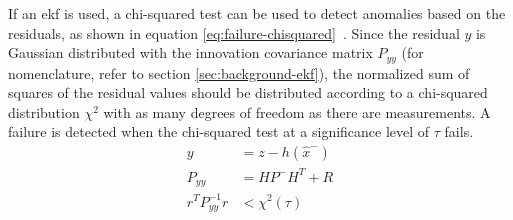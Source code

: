 If an \gls{ekf} is used, a chi-squared test can be used to detect anomalies based on the residuals, as shown in equation \ref{eq:failure-chisquared}~\cites[p.~4292]{Hausman.2016}[p.~2050~f.]{Valls.2018}. Since the residual $y$ is Gaussian distributed with the innovation covariance matrix $P_{yy}$ (for nomenclature, refer to section \ref{sec:background-ekf}), the normalized sum of squares of the residual values should be distributed according to a chi-squared distribution $\chi^2$ with as many degrees of freedom as there are measurements. A failure is detected when the chi-squared test at a significance level of $\tau$ fails.
\begin{subequations}\label{eq:failure-chisquared}
\begin{alignat}{2}%
y &= z - h(\hat{x}^-) \\%
P_{yy} &= H P^- H^T + R \\%
r^T P_{yy}^{-1} r &< \chi^2(\tau)%
\end{alignat}
\end{subequations}

